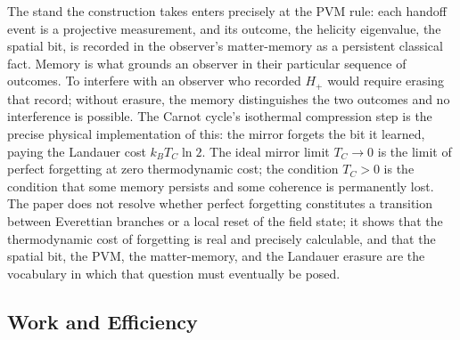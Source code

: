 The stand the construction takes enters 
precisely at the PVM rule: each handoff event 
is a projective measurement, and its outcome,
the helicity eigenvalue, the spatial bit, 
is recorded in the observer's matter-memory as 
a persistent classical fact. Memory is what 
grounds an observer in their particular 
sequence of outcomes. To interfere with an 
observer who recorded $H_+$ would require 
erasing that record; without erasure, the 
memory distinguishes the two outcomes and no 
interference is possible. The Carnot cycle's 
isothermal compression step is the precise 
physical implementation of this: the mirror 
forgets the bit it learned, paying the Landauer 
cost $k_BT_C\ln 2$. The ideal mirror limit 
$T_C\to 0$ is the limit of perfect forgetting 
at zero thermodynamic cost; the condition 
$T_C>0$ is the condition that some memory 
persists and some coherence is permanently 
lost. The paper does not resolve whether 
perfect forgetting constitutes a transition 
between Everettian branches or a local reset 
of the field state; it shows that the 
thermodynamic cost of forgetting is real and 
precisely calculable, and that the spatial bit, 
the PVM, the matter-memory, and the Landauer 
erasure are the vocabulary in which that 
question must eventually be posed.

\subsection{Work and Efficiency}

